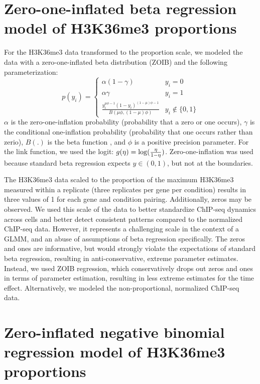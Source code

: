 \documentclass[12pt]{extarticle}
\begin{document}
\section*{Zero-one-inflated beta regression model of H3K36me3 proportions}
For the H3K36me3 data transformed to the proportion scale, we modeled the data with a zero-one-inflated beta distribution (ZOIB) and the following parameterization:
\begin{equation}
	p(y_{i}) = \begin{cases} 
      			\alpha(1 - \gamma) & y_{i} = 0 \\
      			\alpha \gamma & y_{i} = 1 \\
     			 \frac{y_{i}^{\mu\phi - 1}(1 - y_{i})^{(1 - \mu)\phi - 1}}{B(\mu \phi, (1 - \mu)\phi)} & y_{i} \not\in \{0, 1\}
   		\end{cases}
\end{equation}
$\alpha$ is the zero-one-inflation probability (probability that a zero or one occurs), $\gamma$ is the conditional one-inflation probability (probability that one occurs rather than zerio), $B(.)$ is the beta function \cite{Casella2002}, and $\phi$ is a positive precision parameter. For the link function, we used the logit: $g(\eta)= \log\large(\frac{\eta}{1 - \eta}\large)$. Zero-one-inflation was used because standard beta regression expects $y \in (0, 1)$, but not at the boundaries.

The H3K36me3 data scaled to the proportion of the maximum H3K36me3 measured within a replicate (three replicates per gene per condition) results in three values of 1 for each gene and condition pairing. Additionally, zeros may be observed. We used this scale of the data to better standardize ChIP-seq dynamics across cells and better detect consistent patterns compared to the normalized ChIP-seq data. However, it represents a challenging scale in the context of a GLMM, and an abuse of assumptions of beta regression specifically. The zeros and ones are informative, but would strongly violate the expectations of standard beta regression, resulting in anti-conservative, extreme parameter estimates. Instead, we used ZOIB regression, which conservatively drops out zeros and ones in terms of parameter estimation, resulting in less extreme estimates for the time effect. Alternatively, we modeled the non-proportional, normalized ChIP-seq data.

\section*{Zero-inflated negative binomial regression model of H3K36me3 proportions}
\end{document}
